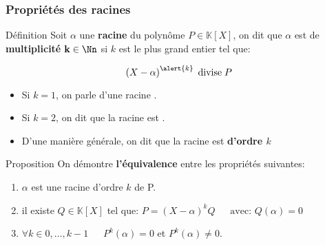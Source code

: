 \documentclass{beamer}
\newcommand{\setK}{\mathbb{K}}
\begin{document}
\begin{frame}[t]
  \frametitle{Propriétés des racines}
 \begin{block}{Définition}
   \small
   Soit $\alpha$ une \textbf{racine} du polynôme $P\in \setK[X]$, on dit que
   $\alpha$ est de \textbf{\alert{multiplicité}}  $\mathbf{k} \in\Nn$ si $k$ est
   le plus grand entier tel que:

   \begin{equation}
     \left( X - \alpha \right)^{\alert{k}} \;\text{divise}\; P 
   \end{equation}
 \end{block} 
 \begin{itemize}
   \small
   \item Si $k=1$,  on parle d'une racine \textbf{}.
   \item Si $k=2$, on dit que la racine est \textbf{}.
   \item D'une manière générale, on dit que la racine est \textbf{d'ordre $k$ }
 \end{itemize}
 \pause
 \begin{block}{Proposition}
   \small
   On démontre \textbf{l'équivalence}  entre les propriétés suivantes:

   \begin{enumerate}
     \item $\alpha$ est une racine d'ordre $k$ de P.\\[4pt]
     \item il existe $Q\in \setK[X]$ tel que:
       $
       P = \left( X - \alpha \right)^k Q\;\quad\; \text{avec: } Q(\alpha) = 0
       $
     \item $\forall k \in {0,\ldots, k-1}\;\quad\; P^{k}(\alpha) = 0$ et
       $P^{k}(\alpha) \neq 0$. 
   \end{enumerate}
 \end{block}

\end{frame}
\end{document}
